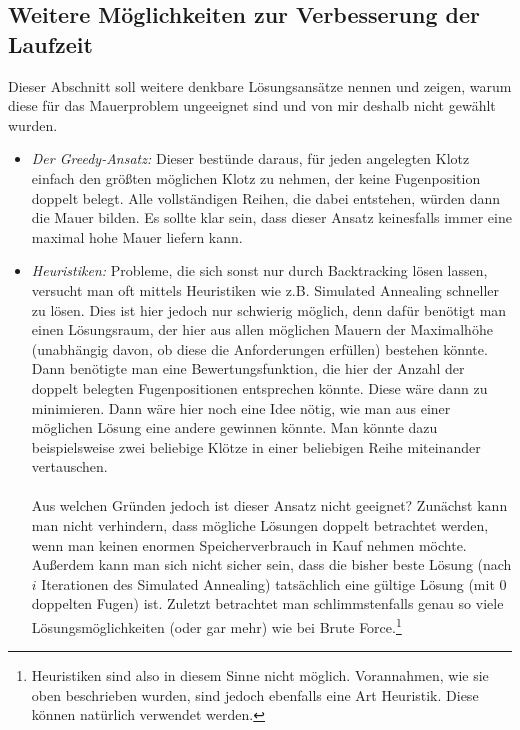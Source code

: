 \documentclass[a4paper, notitlepage, 12pt]{scrartcl}
\begin{document}
\subsection{Weitere Möglichkeiten zur Verbesserung der Laufzeit}
Dieser Abschnitt soll weitere denkbare Lösungsansätze nennen und zeigen, warum diese für das Mauerproblem ungeeignet sind und von mir deshalb nicht gewählt wurden.
\begin{itemize}
\item \textit{Der Greedy-Ansatz:} Dieser bestünde daraus, für jeden angelegten Klotz einfach den größten möglichen Klotz zu nehmen, der keine Fugenposition doppelt belegt. Alle vollständigen Reihen, die dabei entstehen, würden dann die Mauer bilden. Es sollte klar sein, dass dieser Ansatz keinesfalls immer eine maximal hohe Mauer liefern kann.
\item \textit{Heuristiken:} Probleme, die sich sonst nur durch Backtracking lösen lassen, versucht man oft mittels Heuristiken wie z.B. Simulated Annealing schneller zu lösen. Dies ist hier jedoch nur schwierig möglich, denn dafür benötigt man einen Lösungsraum, der hier aus allen möglichen Mauern der Maximalhöhe (unabhängig davon, ob diese die Anforderungen erfüllen) bestehen könnte. Dann benötigte man eine Bewertungsfunktion, die hier der Anzahl der doppelt belegten Fugenpositionen entsprechen könnte. Diese wäre dann zu minimieren. Dann wäre hier noch eine Idee nötig, wie man aus einer möglichen Lösung eine andere gewinnen könnte. Man könnte dazu beispielsweise zwei beliebige Klötze in einer beliebigen Reihe miteinander vertauschen. \\ \\
Aus welchen Gründen jedoch ist dieser Ansatz nicht geeignet? Zunächst kann man nicht verhindern, dass mögliche Lösungen doppelt betrachtet werden, wenn man keinen enormen Speicherverbrauch in Kauf nehmen möchte. Außerdem kann man sich nicht sicher sein, dass die bisher beste Lösung (nach $i$ Iterationen des Simulated Annealing) tatsächlich eine gültige Lösung (mit 0 doppelten Fugen) ist. Zuletzt betrachtet man schlimmstenfalls genau so viele Lösungsmöglichkeiten (oder gar mehr) wie bei Brute Force.\footnote{Heuristiken sind also in diesem Sinne nicht möglich. Vorannahmen, wie sie oben beschrieben wurden, sind jedoch ebenfalls eine Art Heuristik. Diese können natürlich verwendet werden.}

\end{itemize}
\end{document}
